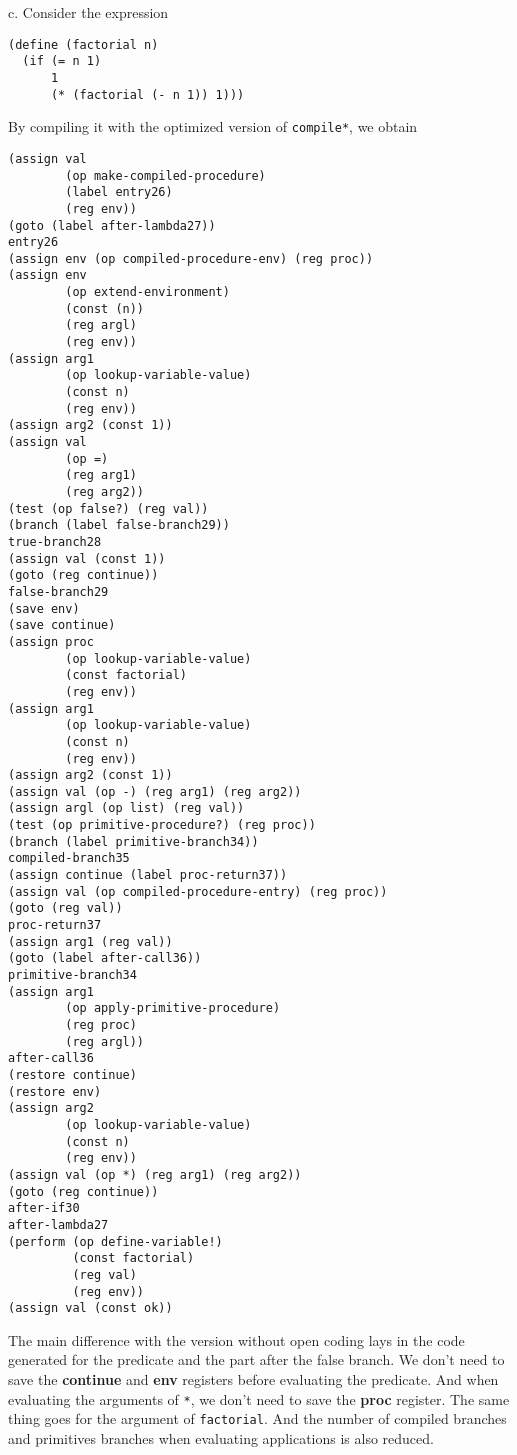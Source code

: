 \documentclass[a4paper,12pt]{article}
\newcommand{\subpar}[1]{\medskip \noindent #1.}
\begin{document}
\subpar{c}  Consider the expression

\begin{lstlisting}
(define (factorial n)
  (if (= n 1)
      1
      (* (factorial (- n 1)) 1)))
\end{lstlisting}

By compiling it with the optimized version of \lstinline!compile*!, we
obtain

\begin{lstlisting}
(assign val
        (op make-compiled-procedure)
        (label entry26)
        (reg env))
(goto (label after-lambda27))
entry26
(assign env (op compiled-procedure-env) (reg proc))
(assign env
        (op extend-environment)
        (const (n))
        (reg argl)
        (reg env))
(assign arg1
        (op lookup-variable-value)
        (const n)
        (reg env))
(assign arg2 (const 1))
(assign val
        (op =)
        (reg arg1)
        (reg arg2))
(test (op false?) (reg val))
(branch (label false-branch29))
true-branch28
(assign val (const 1))
(goto (reg continue))
false-branch29
(save env)
(save continue)
(assign proc
        (op lookup-variable-value)
        (const factorial)
        (reg env))
(assign arg1
        (op lookup-variable-value)
        (const n)
        (reg env))
(assign arg2 (const 1))
(assign val (op -) (reg arg1) (reg arg2))
(assign argl (op list) (reg val))
(test (op primitive-procedure?) (reg proc))
(branch (label primitive-branch34))
compiled-branch35
(assign continue (label proc-return37))
(assign val (op compiled-procedure-entry) (reg proc))
(goto (reg val))
proc-return37
(assign arg1 (reg val))
(goto (label after-call36))
primitive-branch34
(assign arg1
        (op apply-primitive-procedure)
        (reg proc)
        (reg argl))
after-call36
(restore continue)
(restore env)
(assign arg2
        (op lookup-variable-value)
        (const n)
        (reg env))
(assign val (op *) (reg arg1) (reg arg2))
(goto (reg continue))
after-if30
after-lambda27
(perform (op define-variable!)
         (const factorial)
         (reg val)
         (reg env))
(assign val (const ok))
\end{lstlisting}

The main difference with the version without open coding lays in the
code generated for the predicate and the part after the false branch.
We don't need to save the \textbf{continue} and \textbf{env} registers
before evaluating the predicate.  And when evaluating the arguments of
\lstinline!*!, we don't need to save the \textbf{proc} register.  The
same thing goes for the argument of \lstinline!factorial!.  And the
number of compiled branches and primitives branches when evaluating
applications is also reduced.
\end{document}
